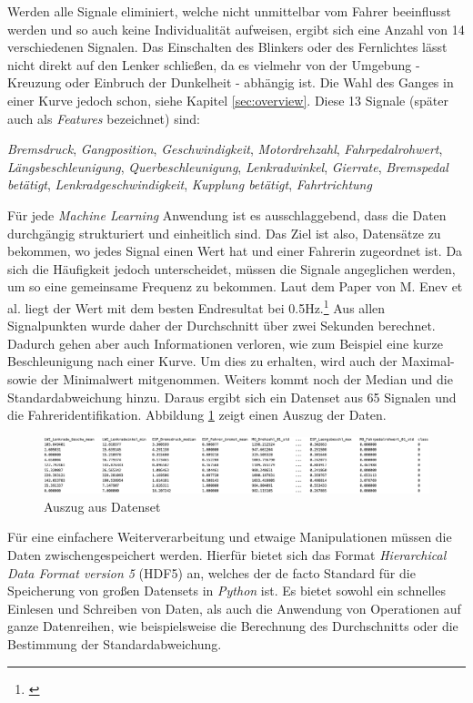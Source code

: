Werden alle Signale eliminiert, welche nicht unmittelbar vom Fahrer beeinflusst werden und so auch keine Individualität aufweisen, ergibt sich eine Anzahl von 14 verschiedenen Signalen. Das Einschalten des Blinkers oder des Fernlichtes lässt nicht direkt auf den Lenker schließen, da es vielmehr von der Umgebung - Kreuzung oder Einbruch der Dunkelheit - abhängig ist. Die Wahl des Ganges in einer Kurve jedoch schon, siehe Kapitel \ref{sec:overview}. Diese 13 Signale (später auch als \textit{Features} bezeichnet) sind:

\textit{Bremsdruck}, \textit{Gangposition}, \textit{Geschwindigkeit}, \textit{Motordrehzahl}, \textit{Fahrpedalrohwert}, \textit{Längsbeschleunigung}, \textit{Querbeschleunigung}, \textit{Lenkradwinkel}, \textit{Gierrate}, \textit{Bremspedal betätigt}, \textit{Lenkradgeschwindigkeit}, \textit{Kupplung betätigt}, \textit{Fahrtrichtung}

Für jede \textit{Machine Learning} Anwendung ist es ausschlaggebend, dass die Daten durchgängig strukturiert und einheitlich sind. Das Ziel ist also, Datensätze zu bekommen, wo jedes Signal einen Wert hat und einer Fahrerin zugeordnet ist. Da sich die Häufigkeit jedoch unterscheidet, müssen die Signale angeglichen werden, um so eine gemeinsame Frequenz zu bekommen. Laut dem Paper von M. Enev et al. liegt der Wert mit dem besten Endresultat bei 0.5Hz.\footnote{\cite{Enev2016}} Aus allen Signalpunkten wurde daher der Durchschnitt über zwei Sekunden berechnet. Dadurch gehen aber auch Informationen verloren, wie zum Beispiel eine kurze Beschleunigung nach einer Kurve. Um dies zu erhalten, wird auch der Maximal- sowie der Minimalwert mitgenommen. Weiters kommt noch der Median und die Standardabweichung hinzu. Daraus ergibt sich ein Datenset aus 65 Signalen und die Fahreridentifikation. Abbildung \ref{fig:dataset} zeigt einen Auszug der Daten.

\begin{figure}[htbp]
	\centering
		\includegraphics[width=\textwidth]{images/dataset.png}
	\caption{Auszug aus Datenset}
	\label{fig:dataset}
\end{figure}

Für eine einfachere Weiterverarbeitung und etwaige Manipulationen müssen die Daten zwischengespeichert werden. Hierfür bietet sich das Format \textit{Hierarchical Data Format version 5} (HDF5) an, welches der de facto Standard für die Speicherung von großen Datensets in \textit{Python} ist. Es bietet sowohl ein schnelles Einlesen und Schreiben von Daten, als auch die Anwendung von Operationen auf ganze Datenreihen, wie beispielsweise die Berechnung des Durchschnitts oder die Bestimmung der Standardabweichung.\cite{Collete2013}

